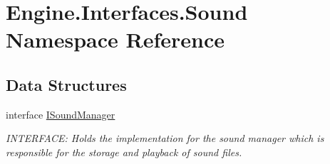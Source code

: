 \hypertarget{a00265}{}\section{Engine.\+Interfaces.\+Sound Namespace Reference}
\label{a00265}
\subsection*{Data Structures}
\begin{DoxyCompactItemize}
\item 
interface \hyperlink{a00482}{I\+Sound\+Manager}
\begin{DoxyCompactList}\small\item\em I\+N\+T\+E\+R\+F\+A\+CE\+: Holds the implementation for the sound manager which is responsible for the storage and playback of sound files. \end{DoxyCompactList}\end{DoxyCompactItemize}
